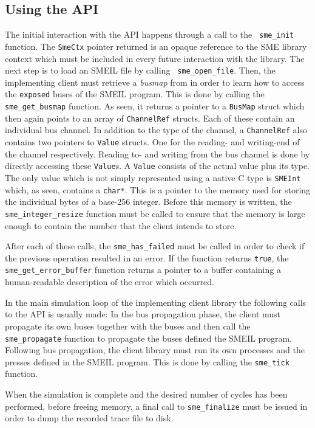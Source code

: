 \subsection{Using the API}
The initial interaction with the API happens through a call to the {\tt
  sme_init} function. The {\tt SmeCtx} pointer returned is an opaque reference
to the SME library context which must be included in every future interaction
with the library. The next step is to load an SMEIL file by calling {\tt
  sme_open_file}. Then, the implementing client must retrieve a {\it busmap}
from \libsme{} in order to learn how to access the {\tt exposed} buses of the
SMEIL program. This is done by calling the {\tt sme_get_busmap} function. As
seen, it returns a pointer to a {\tt BusMap} struct which then again points to
an array of {\tt ChannelRef} structs. Each of these contain an individual bus
channel. In addition to the type of the channel, a {\tt ChannelRef} also
contains two pointers to {\tt Value} structs. One for the reading- and
writing-end of the channel respectively. Reading to- and writing from the bus
channel is done by directly accessing these {\tt Value}s. A {\tt Value} consists
of the actual value plus its type. The only value which is not simply
represented using a native C type is {\tt SMEInt} which, as seen, contains a
{\tt char*}. This is a pointer to the memory used for storing the individual
bytes of a base-256 integer. Before this memory is written, the {\tt
  sme_integer_resize} function must be called to ensure that the memory is large
enough to contain the number that the client intends to store.

After each of these calls, the {\tt sme_has_failed} must be called in order to
check if the previous operation resulted in an error. If the function returns
{\tt true}, the {\tt sme_get_error_buffer} function returns a pointer to a
buffer containing a human-readable description of the error which occurred.

In the main simulation loop of the implementing client library the following
calls to the API is usually made: In the bus propagation phase, the client must
propagate its own buses together with the buses and then call the {\tt
  sme_propagate} function to propagate the buses defined the SMEIL
program. Following bus propagation, the client library must run its own
processes and the presses defined in the SMEIL program. This is done by calling
the {\tt sme_tick} function.

When the simulation is complete and the desired number of cycles has been
performed, before freeing memory, a final call to {\tt sme_finalize} must be
issued in order to dump the recorded trace file to disk.

